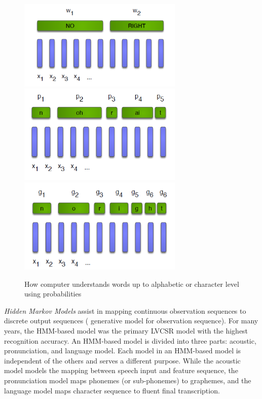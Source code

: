 \begin{figure}[ht!]
    \centering
    \includegraphics[width=0.7\textwidth]{img/trainingchallenge.png}
    \includegraphics[width=0.7\textwidth]{img/trainingchallenge2.png}
    \includegraphics[width=0.7\textwidth]{img/training challenge.png}
    \label{fig:How-Computer-Understands-Words}
    \caption{How computer understands words up to alphabetic or character level using probabilities}
\end{figure}
\newpage
\textit{Hidden Markov Models} assist in mapping continuous observation sequences to discrete output sequences ( generative model for observation sequence). For many years, the HMM-based model was the primary LVCSR model with the highest recognition accuracy. An HMM-based model is divided into three parts: acoustic, pronunciation, and language model. Each model in an HMM-based model is independent of the others and serves a different purpose. While the acoustic model models the mapping between speech input and feature sequence, the pronunciation model maps phonemes (or sub-phonemes) to graphemes, and the language model maps character sequence to fluent final transcription.

